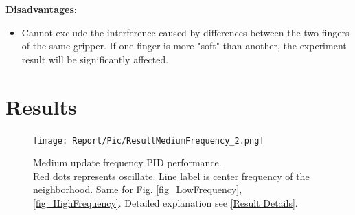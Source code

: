 \documentclass[conference]{IEEEtran}
\begin{document}
 \textbf{Disadvantages}:
  \begin{itemize}
     \item Cannot exclude the interference caused by differences between the two fingers of the same gripper. If one finger is more "soft" than another, the experiment result will be significantly affected.
 \end{itemize}

\section{Results}

\label{results}

\begin{figure}
    \centerline{\texttt{[image: Report/Pic/ResultMediumFrequency\_2.png]}}
    \caption{Medium update frequency PID performance. \protect\\ Red dots represents oscillate. Line label is center frequency of the neighborhood. Same for Fig. \ref{fig_LowFrequency}, \ref{fig_HighFrequency}. Detailed explanation see \ref{Result Details}.}
    \label{fig_MediumFrequency}
\end{figure}
\end{document}

